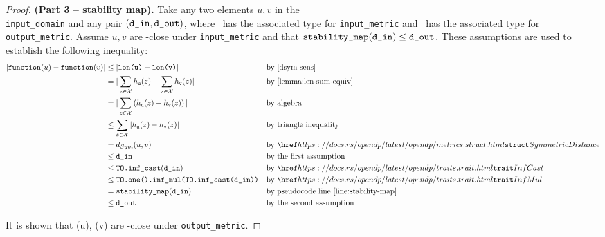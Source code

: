 \documentclass{article}
\begin{document}
\begin{proof} \textbf{(Part 3 -- stability map).} 
    Take any two elements $u, v$ in the \\\texttt{input\_domain} and any pair $(\texttt{d\_in}, \texttt{d\_out})$, 
    where \din\ has the associated type for \texttt{input\_metric} and \dout\ has the associated type for \texttt{output\_metric}.
    Assume $u, v$ are \din-close under \texttt{input\_metric} and that $\texttt{stability\_map}(\texttt{d\_in}) \leq \texttt{d\_out}$. 
    These assumptions are used to establish the following inequality:
    \begin{align*}
        |\function(u) - \function(v)| &\leq |\texttt{len(u)} - \texttt{len(v)}| &&\text{by }\ref{dsym-sens} \\
        &= |\sum_{z\in \mathcal{X}} h_{\texttt{u}}(z) - \sum_{z\in \mathcal{X}} h_{\texttt{v}}(z)| &&\text{by } \ref{lemma:len-sum-equiv} \\
        &= |\sum_{z\in \mathcal{X}}\left(h_{\texttt{u}}(z) - h_{\texttt{v}}(z)\right)| &&\text{by algebra} \\
        &\leq \sum_{z\in \mathcal{X}}|h_{\texttt{u}}(z) - h_{\texttt{v}}(z)| &&\text{by triangle inequality} \\
        &= d_{Sym}(u, v) &&\text{by } \rustdoc{metrics}{struct}{SymmetricDistance}\\
        &\leq \din &&\text{by the first assumption} \\
        &\leq \texttt{TO.inf\_cast}(\din) &&\text{by } \rustdoc{traits}{trait}{InfCast} \\
        &\leq \texttt{TO.one().inf\_mul(TO.inf\_cast(\din))} &&\text{by } \rustdoc{traits}{trait}{InfMul} \\
        &=\texttt{stability\_map}(\din) &&\text{by pseudocode line } \ref{line:stability-map} \\
        &\leq \dout &&\text{by the second assumption}
    \end{align*}

    It is shown that \function(u), \function(v) are \dout-close under \texttt{output\_metric}.
\end{proof}
\end{document}
